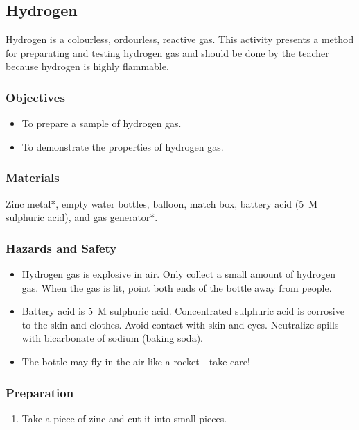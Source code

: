 \subsection{Hydrogen}

Hydrogen is a colourless, ordourless, reactive gas. This activity presents a method for preparating and testing hydrogen gas and should be done by the teacher because hydrogen is highly flammable.

\subsubsection*{Objectives}
\begin{itemize}
\item{To prepare a sample of hydrogen gas.}
\item{To demonstrate the properties of hydrogen gas.}
\end{itemize}

\subsubsection*{Materials}
Zinc metal*, empty water bottles, balloon, match box, battery acid (5~M sulphuric acid), and gas generator*.

\subsubsection*{Hazards and Safety}
\begin{itemize}
\item{Hydrogen gas is explosive in air. Only collect a small amount of hydrogen gas. When the gas is lit, point both ends of the bottle away from people.}
\item{Battery acid is 5~M sulphuric acid. Concentrated sulphuric acid is corrosive to the skin and clothes. Avoid contact with skin and eyes. Neutralize spills with bicarbonate of sodium (baking soda).}
\item{The bottle may fly in the air like a rocket - take care!}
\end{itemize}

\subsubsection*{Preparation}
\begin{enumerate}
\item{Take a piece of zinc and cut it into small pieces.}
\end{enumerate}

